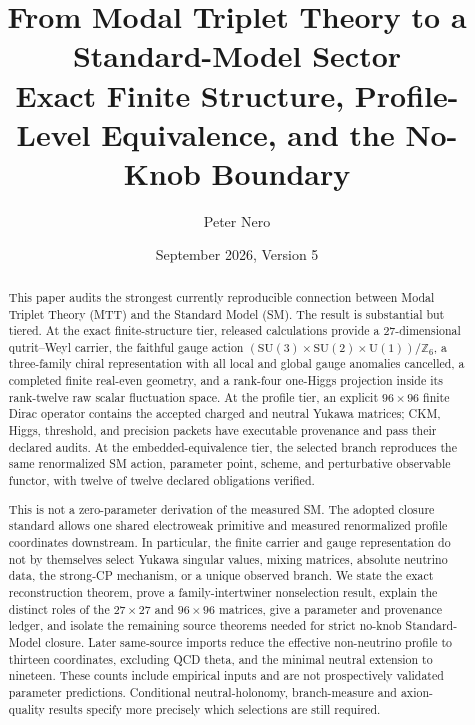 \documentclass[11pt]{article}
\title{\Large From Modal Triplet Theory to a Standard-Model Sector\\
Exact Finite Structure, Profile-Level Equivalence, and the No-Knob Boundary}
\author{Peter Nero}
\date{September 2026, Version 5}
\newcommand{\Z}{\mathbb{Z}}
\newcommand{\SU}{\mathrm{SU}}
\newcommand{\U}{\mathrm{U}}
\begin{document}
\maketitle

\begin{abstract}
This paper audits the strongest currently reproducible connection between Modal Triplet
Theory (MTT) and the Standard Model (SM).  The result is substantial but tiered.  At the
exact finite-structure tier, released calculations provide a 27-dimensional qutrit--Weyl
carrier, the faithful gauge action
$(\SU(3)\times\SU(2)\times\U(1))/\Z_6$, a three-family chiral representation with all
local and global gauge anomalies cancelled, a completed finite real-even geometry, and a
rank-four one-Higgs projection inside its rank-twelve raw scalar fluctuation space.  At the
profile tier, an explicit $96\times96$ finite Dirac operator contains the accepted charged
and neutral Yukawa matrices; CKM, Higgs, threshold, and precision packets have executable
provenance and pass their declared audits.  At the embedded-equivalence tier, the selected
branch reproduces the same renormalized SM action, parameter point, scheme, and perturbative
observable functor, with twelve of twelve declared obligations verified.

This is not a zero-parameter derivation of the measured SM.  The adopted closure standard
allows one shared electroweak primitive and measured renormalized profile coordinates
downstream.  In particular, the finite carrier and gauge representation do not by themselves
select Yukawa singular values, mixing matrices, absolute neutrino data, the strong-CP
mechanism, or a unique observed branch.  We state the exact reconstruction theorem, prove a
family-intertwiner nonselection result, explain the distinct roles of the $27\times27$ and
$96\times96$ matrices, give a parameter and provenance ledger, and isolate the remaining
source theorems needed for strict no-knob Standard-Model closure.  Later same-source imports
reduce the effective non-neutrino profile to thirteen coordinates, excluding QCD theta, and
the minimal neutral extension to nineteen.  These counts include empirical inputs and are not
prospectively validated parameter predictions.  Conditional neutral-holonomy, branch-measure
and axion-quality results specify more precisely which selections are still required.
\end{abstract}
\end{document}
